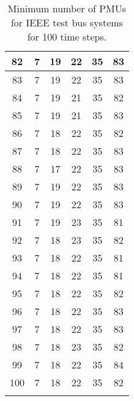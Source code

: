 \documentclass[10pt,journal,twocolumn]{IEEEtran}\IEEEoverridecommandlockouts
\begin{document}
{\begin{longtable}{|c|c|c|c|c|c|}
    82    & 7     & 19    & 22    & 35    & 83 \\\hline
    83    & 7     & 19    & 22    & 35    & 83 \\\hline
    84    & 7     & 19    & 21    & 35    & 82 \\\hline
    85    & 7     & 19    & 21    & 35    & 83 \\\hline
    86    & 7     & 18    & 22    & 35    & 82 \\\hline
    87    & 7     & 18    & 22    & 35    & 83 \\\hline
    88    & 7     & 17    & 22    & 35    & 83 \\\hline
    89    & 7     & 19    & 22    & 35    & 83 \\\hline
    90    & 7     & 19    & 22    & 35    & 83 \\\hline
    91    & 7     & 19    & 23    & 35    & 81 \\\hline
    92    & 7     & 18    & 23    & 35    & 82 \\\hline
    93    & 7     & 18    & 22    & 35    & 81 \\\hline
    94    & 7     & 18    & 22    & 35    & 81 \\\hline
    95    & 7     & 18    & 22    & 35    & 82 \\\hline
    96    & 7     & 18    & 22    & 35    & 83 \\\hline
    97    & 7     & 18    & 22    & 35    & 83 \\\hline
    98    & 7     & 18    & 23    & 35    & 82 \\\hline
    99    & 7     & 18    & 22    & 35    & 84 \\\hline
    100   & 7     & 18    & 22    & 35    & 82 \\\hline
    \caption{Minimum number of PMUs for IEEE test bus systems for 100 time steps.}
    \label{tab:results_minnum}
\end{longtable}
}
\end{document}

